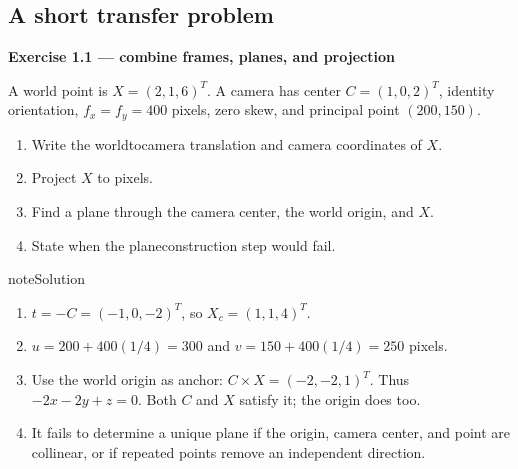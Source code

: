 \documentclass[letterpaper,11pt,english,openany,oneside]{jupyterBook}
\begin{document}
\subsection{A short transfer problem}
\label{\detokenize{lectures/lecture01/review:a-short-transfer-problem}}\label{\detokenize{lectures/lecture01/review:ex-lec01-transfer}}
\begin{TextbookBox}
\textbf{Exercise 1.1 — combine frames, planes, and projection}\par\smallskip

\sphinxAtStartPar
A world point is \(X=(2,1,6)^T\). A camera has center \(C=(1,0,2)^T\), identity orientation, \(f_x=f_y=400\) pixels, zero skew, and principal point \((200,150)\).
\begin{enumerate}
%
\item {}
\sphinxAtStartPar
Write the world\sphinxhyphen{}to\sphinxhyphen{}camera translation and camera coordinates of \(X\).

\item {}
\sphinxAtStartPar
Project \(X\) to pixels.

\item {}
\sphinxAtStartPar
Find a plane through the camera center, the world origin, and \(X\).

\item {}
\sphinxAtStartPar
State when the plane\sphinxhyphen{}construction step would fail.

\end{enumerate}

\end{TextbookBox}

\begin{sphinxadmonition}{note}{Solution}
\begin{enumerate}
%
\item {}
\sphinxAtStartPar
\(t=-C=(-1,0,-2)^T\), so \(X_c=(1,1,4)^T\).

\item {}
\sphinxAtStartPar
\(u=200+400(1/4)=300\) and \(v=150+400(1/4)=250\) pixels.

\item {}
\sphinxAtStartPar
Use the world origin as anchor: \(C\times X=(-2,-2,1)^T\). Thus \(-2x-2y+z=0\). Both \(C\) and \(X\) satisfy it; the origin does too.

\item {}
\sphinxAtStartPar
It fails to determine a unique plane if the origin, camera center, and point are collinear, or if repeated points remove an independent direction.

\end{enumerate}
\end{sphinxadmonition}
\end{document}
